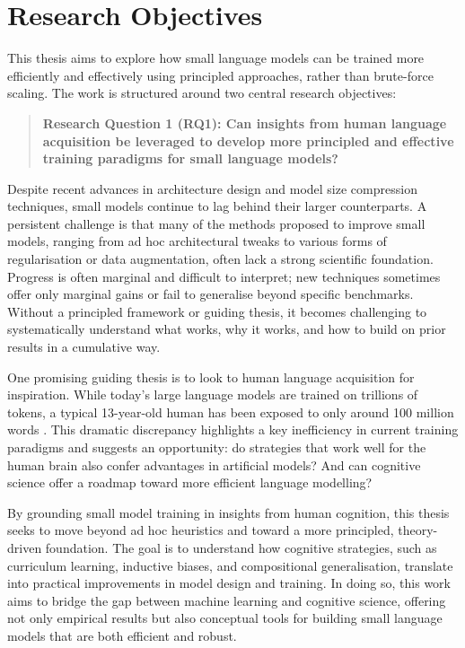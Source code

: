 
\section*{Research Objectives}

This thesis aims to explore how small language models can be trained more efficiently and effectively using principled approaches, rather than brute-force scaling. The work is structured around two central research objectives:

\begin{quote}
    \textbf{Research Question 1 (RQ1): Can insights from human language acquisition be leveraged to develop more principled and effective training paradigms for small language models?}
\end{quote}

Despite recent advances in architecture design and model size compression techniques, small models continue to lag behind their larger counterparts. A persistent challenge is that many of the methods proposed to improve small models, ranging from ad hoc architectural tweaks to various forms of regularisation or data augmentation, often lack a strong scientific foundation. Progress is often marginal and difficult to interpret; new techniques sometimes offer only marginal gains or fail to generalise beyond specific benchmarks. Without a principled framework or guiding thesis, it becomes challenging to systematically understand what works, why it works, and how to build on prior results in a cumulative way.

One promising guiding thesis is to look to human language acquisition for inspiration. While today's large language models are trained on trillions of tokens, a typical 13-year-old human has been exposed to only around 100 million words \citep{warstadt2023babylm1}. This dramatic discrepancy highlights a key inefficiency in current training paradigms and suggests an opportunity: do strategies that work well for the human brain also confer advantages in artificial models? And can cognitive science offer a roadmap toward more efficient language modelling?

By grounding small model training in insights from human cognition, this thesis seeks to move beyond ad hoc heuristics and toward a more principled, theory-driven foundation. The goal is to understand how cognitive strategies, such as curriculum learning, inductive biases, and compositional generalisation, translate into practical improvements in model design and training. In doing so, this work aims to bridge the gap between machine learning and cognitive science, offering not only empirical results but also conceptual tools for building small language models that are both efficient and robust.

